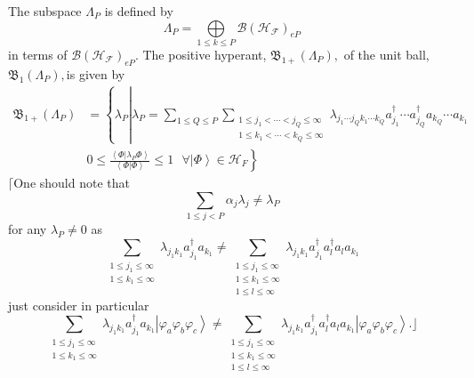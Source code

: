 \documentclass[aps,preprint]{revtex4}%
\begin{document}
The subspace $\Lambda_{P}$ is defined by
\begin{equation}
\Lambda_{P}=%
{\displaystyle\bigoplus\limits_{1\leq k\leq P}}
\mathcal{B}\left(  \mathcal{H}_{\mathcal{F}}\right)  _{eP}%
\end{equation}
in terms of $\mathcal{B}\left(  \mathcal{H}_{\mathcal{F}}\right)  _{eP}.$ The
positive hyperant, $\mathfrak{B}_{1+}\left(  \Lambda_{P}\right)  ,$ of the
unit ball, $\mathfrak{B}_{1}\left(  \Lambda_{P}\right)  ,$is given by
\begin{align}
\mathfrak{B}_{1+}\left(  \Lambda_{P}\right)   &  =\left\{  \lambda
_{P}\left\vert \lambda_{P}=\sum_{1\leq Q\leq P}\sum_{\substack{1\leq
j_{1}<\cdots<j_{Q}\leq\infty\\1\leq k_{1}<\cdots<k_{Q}\leq\infty}%
}\lambda_{j_{1}\cdots j_{Q}k_{1}\cdots k_{Q}}a_{j_{1}}^{\dagger}\cdots
a_{j_{Q}}^{\dagger}a_{k_{Q}}\cdots a_{k_{1}}\right.  \right. \nonumber\\
&  \left.  0\leq\frac{\left\langle \left.  \Phi\right\vert \lambda_{P}%
\Phi\right\rangle }{\left\langle \left.  \Phi\right\vert \Phi\right\rangle
}\leq1\text{ }\forall\left\vert \Phi\right\rangle \in\mathcal{H}_{F}\right\}
\end{align}
$\lceil$One should note that
\begin{equation}
\sum_{1\leq j<P}\alpha_{j}\lambda_{j}\neq\lambda_{P}%
\end{equation}
for any $\lambda_{P}\neq0$ as
\begin{equation}
\sum_{\substack{1\leq j_{1}\leq\infty\\1\leq k_{1}\leq\infty}}\lambda
_{j_{1}k_{1}}a_{j_{1}}^{\dagger}a_{k_{1}}\neq\sum_{\substack{1\leq j_{1}%
\leq\infty\\1\leq k_{1}\leq\infty\\1\leq l\leq\infty}}\lambda_{j_{1}k_{1}%
}a_{j_{1}}^{\dagger}a_{l}^{\dagger}a_{l}a_{k_{1}}%
\end{equation}
just consider in particular
\begin{equation}
\sum_{\substack{1\leq j_{1}\leq\infty\\1\leq k_{1}\leq\infty}}\lambda
_{j_{1}k_{1}}a_{j_{1}}^{\dagger}a_{k_{1}}\left\vert \varphi_{a}\varphi
_{b}\varphi_{c}\right\rangle \neq\sum_{\substack{1\leq j_{1}\leq\infty\\1\leq
k_{1}\leq\infty\\1\leq l\leq\infty}}\lambda_{j_{1}k_{1}}a_{j_{1}}^{\dagger
}a_{l}^{\dagger}a_{l}a_{k_{1}}\left\vert \varphi_{a}\varphi_{b}\varphi
_{c}\right\rangle .\rfloor
\end{equation}
\end{document}
